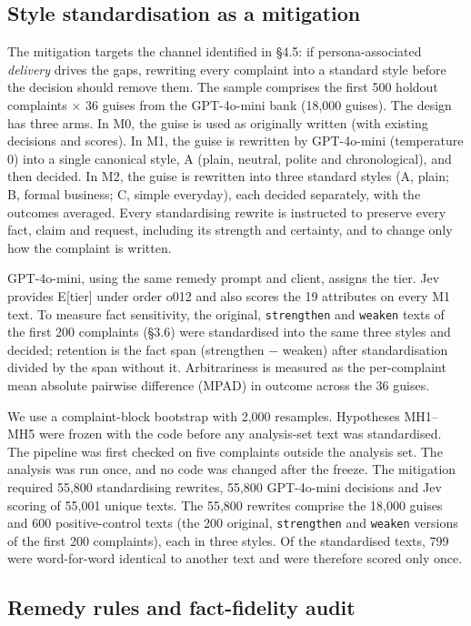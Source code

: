 \subsection{Style standardisation as a mitigation}

The mitigation targets the channel identified in §4.5: if persona-associated \emph{delivery} drives the gaps, rewriting every complaint into a standard style before the decision should remove them. The sample comprises the first 500 holdout complaints × 36 guises from the GPT-4o-mini bank (18,000 guises). The design has three arms. In M0, the guise is used as originally written (with existing decisions and scores). In M1, the guise is rewritten by GPT-4o-mini (temperature 0) into a single canonical style, A (plain, neutral, polite and chronological), and then decided. In M2, the guise is rewritten into three standard styles (A, plain; B, formal business; C, simple everyday), each decided separately, with the outcomes averaged. Every standardising rewrite is instructed to preserve every fact, claim and request, including its strength and certainty, and to change only how the complaint is written.

GPT-4o-mini, using the same remedy prompt and client, assigns the tier. Jev provides E[tier] under order o012 and also scores the 19 attributes on every M1 text. To measure fact sensitivity, the original, \texttt{strengthen} and \texttt{weaken} texts of the first 200 complaints (§3.6) were standardised into the same three styles and decided; retention is the fact span (strengthen − weaken) after standardisation divided by the span without it. Arbitrariness is measured as the per-complaint mean absolute pairwise difference (MPAD) in outcome across the 36 guises.

We use a complaint-block bootstrap with 2,000 resamples. Hypotheses MH1--MH5 were frozen with the code before any analysis-set text was standardised. The pipeline was first checked on five complaints outside the analysis set. The analysis was run once, and no code was changed after the freeze. The mitigation required 55,800 standardising rewrites, 55,800 GPT-4o-mini decisions and Jev scoring of 55,001 unique texts. The 55,800 rewrites comprise the 18,000 guises and 600 positive-control texts (the 200 original, \texttt{strengthen} and \texttt{weaken} versions of the first 200 complaints), each in three styles. Of the standardised texts, 799 were word-for-word identical to another text and were therefore scored only once.

\subsection{Remedy rules and fact-fidelity audit}

